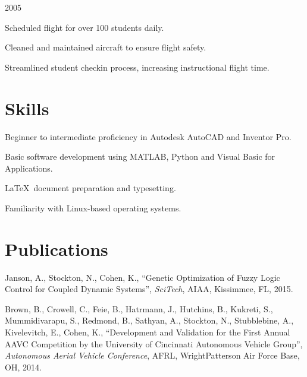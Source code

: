 \documentclass[letterpaper,10pt]{resume}
\begin{document}
	{2005}
	\begin{compactitem}
		\item Scheduled flight for over 100 students daily.
		\item Cleaned and maintained aircraft to ensure flight safety.
		\item Streamlined student check\textendash in process, increasing instructional flight time.
	\end{compactitem}


	\section{Skills}
	\begin{compactitem}
	\item Beginner to intermediate proficiency in Autodesk AutoCAD and Inventor Pro.
	\item Basic software development using MATLAB, Python and Visual Basic for Applications.
	\item \LaTeX\ document preparation and typesetting.
	\item Familiarity with Linux-based operating systems.
	\end{compactitem}
	
	\section{Publications}
	\begin{compactitem}
		\item Janson, A., Stockton, N., Cohen, K., ``Genetic Optimization of Fuzzy Logic Control for Coupled Dynamic Systems'', \emph{SciTech}, AIAA, Kissimmee, FL, 2015.
		\item Brown, B., Crowell, C., Feie, B., Hatrmann, J., Hutchins, B., Kukreti, S., Mummidivarapu, S., Redmond, B., Sathyan, A., Stockton, N., Stubblebine, A., Kivelevitch, E., Cohen, K., ``Development and Validation for the First Annual AAVC Competition by the University of Cincinnati Autonomous Vehicle Group'', \emph{Autonomous Aerial Vehicle Conference}, AFRL, Wright\textendash Patterson Air Force Base, OH, 2014.
	\end{compactitem}
\end{document}
